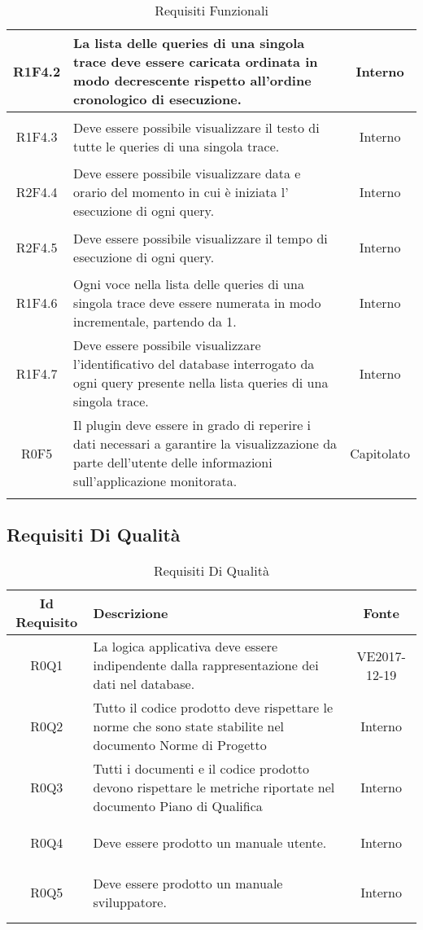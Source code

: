 \begin{longtable}{|c|H|c|}
\hypertarget{R1F4.2}{R1F4.2} & La lista delle queries di una singola trace deve essere caricata ordinata in modo decrescente rispetto all'ordine cronologico di esecuzione. & Interno \\ \hline 
\hypertarget{R1F4.3}{R1F4.3} & Deve essere possibile visualizzare il testo di tutte le queries di una singola trace. & Interno \\ \hline 
\hypertarget{R2F4.4}{R2F4.4} & Deve essere possibile visualizzare data e orario del momento in cui è iniziata l' esecuzione di ogni query. & Interno \\ \hline 
\hypertarget{R2F4.5}{R2F4.5} & Deve essere possibile visualizzare il tempo di esecuzione di ogni query. & Interno \\ \hline 
\hypertarget{R1F4.6}{R1F4.6} & Ogni voce nella lista delle queries di una singola trace deve essere numerata in modo incrementale, partendo da 1. & Interno \\ \hline 
\hypertarget{R1F4.7}{R1F4.7} & Deve essere possibile visualizzare l'identificativo del database interrogato da ogni query presente nella lista queries di una singola trace. & Interno \\ \hline 
\hypertarget{R0F5}{R0F5} &  Il plugin deve essere in grado di reperire i dati necessari a garantire la visualizzazione da parte dell'utente delle informazioni sull'applicazione monitorata. & Capitolato  \\ \hline 
\caption[Requisiti Funzionali]{Requisiti Funzionali}
\label{tabella:req0}
\end{longtable}
\clearpage
{}
\subsection{Requisiti Di Qualità}
\normalsize
\begin{longtable}{|c|H|c|}
\hline
\textbf{Id Requisito} & \textbf{Descrizione} & \textbf{Fonte}\\
\hline
\endhead
\hypertarget{R0Q1}{R0Q1} & La logica applicativa deve essere indipendente dalla rappresentazione dei dati nel database. & VE2017-12-19 \\ \hline 
\hypertarget{R0Q2}{R0Q2} & Tutto il codice prodotto deve rispettare le norme che sono state stabilite nel documento Norme di Progetto & Interno \\ \hline 
\hypertarget{R0Q3}{R0Q3} & Tutti i documenti e il codice prodotto devono rispettare le metriche riportate nel documento Piano di Qualifica & Interno \\ \hline 
\hypertarget{R0Q4}{R0Q4} & Deve essere prodotto un manuale utente. & Interno \\ \hline 
\hypertarget{R0Q5}{R0Q5} & Deve essere prodotto un manuale sviluppatore. & Interno \\ \hline 
\caption[Requisiti Di Qualità]{Requisiti Di Qualità}
\label{tabella:req1}
\end{longtable}
\clearpage
{}
